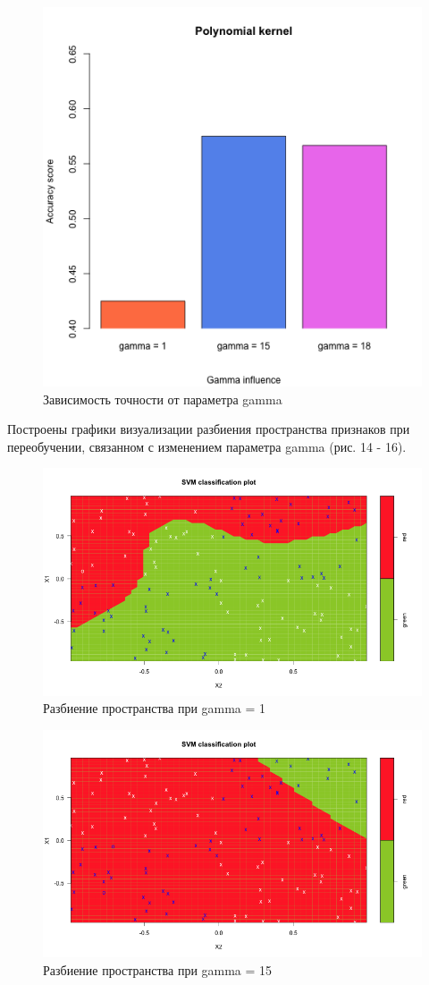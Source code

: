 \documentclass[]{article}
\numberwithin{equation}{section}
\begin{document}
        \begin{figure}[H]
            \centering
            \includegraphics[width = 0.65\linewidth]{data/data5_gamma_hist.png}
            \caption{Зависимость точности от параметра gamma}
        \end{figure}
        Построены графики визуализации разбиения пространства признаков при переобучении, связанном с изменением параметра gamma (рис. 14 - 16).
        \vspace{-0.4cm}
        \begin{figure}[H]
            \centering
            \includegraphics[width = 0.9\linewidth]{data/data5_poly_1.png}
            \caption{Разбиение пространства при gamma = 1}
        \end{figure}

        \begin{figure}[H]
            \centering
            \includegraphics[width = 0.9\linewidth]{data/data5_poly_15.png}
            \caption{Разбиение пространства при gamma = 15}
        \end{figure}
\end{document}
